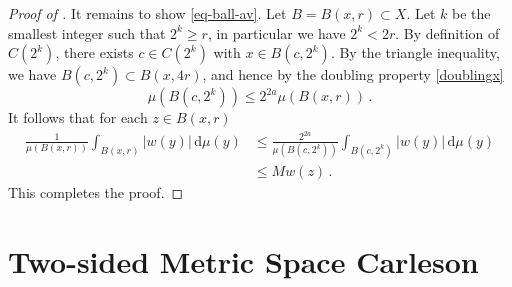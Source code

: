\begin{proof}[Proof of ]
It remains to show \eqref{eq-ball-av}. Let $B = B(x, r) \subset X$. Let $k$ be the smallest integer such that $2^k \ge r$, in particular we have $2^k < 2r$. By definition of $C(2^k)$, there exists $c \in C(2^k)$ with $x \in B(c, 2^k)$. By the triangle inequality, we have $B(c, 2^k) \subset B(x, 4r)$, and hence by the doubling property \eqref{doublingx}
$$
    \mu(B(c, 2^k)) \le 2^{2a} \mu(B(x,r))\,.
$$
It follows that for each $z \in B(x,r)$
\begin{align*}
    \frac{1}{\mu(B(x,r))}\int_{B(x,r)} |w(y)| \, \mathrm{d}\mu(y) &\le \frac{2^{2a}}{\mu(B(c,2^k))}\int_{B(c,2^k)} |w(y)| \, \mathrm{d}\mu(y) \\
    &\le Mw(z)\,.
\end{align*}
This completes the proof.
\end{proof}

\section{Two-sided Metric Space Carleson}

